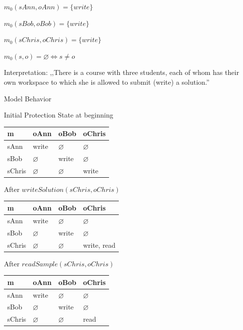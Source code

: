 \documentclass[a4paper]{article}
\begin{document}
\begin{multicols}{3}
\begin{itemize*}
\begin{itemize*}
\begin{itemize*}
                \item $m_0(sAnn,oAnn)=\{write\}$
                \item $m_0(sBob,oBob)=\{write\}$
                \item $m_0(sChris,oChris)=\{write\}$
                \item $m_0(s,o)=\varnothing \Leftrightarrow s\not= o$
            \end{itemize*}
            \item Interpretation: ,,There is a course with three students, each of whom has their own workspace to which she is allowed to submit (write) a solution.''
        \end{itemize*}
    \end{itemize*}

    Model Behavior
    \begin{itemize*}
        \item Initial Protection State at beginning
        \begin{center}\begin{tabular}{l|l|l|l}
                m      & oAnn          & oBob          & oChris        \\\hline
                sAnn   & {write}       & $\varnothing$ & $\varnothing$ \\
                sBob   & $\varnothing$ & {write}       & $\varnothing$ \\
                sChris & $\varnothing$ & $\varnothing$ & {write}
            \end{tabular}\end{center}
        \item After $writeSolution(sChris, oChris)$
        \begin{center}\begin{tabular}{l|l|l|l}
                m      & oAnn          & oBob          & oChris        \\\hline
                sAnn   & {write}       & $\varnothing$ & $\varnothing$ \\
                sBob   & $\varnothing$ & {write}       & $\varnothing$ \\
                sChris & $\varnothing$ & $\varnothing$ & {write, read}
            \end{tabular}\end{center}
        \item After $readSample(sChris, oChris)$
        \begin{center}\begin{tabular}{l|l|l|l}
                m      & oAnn          & oBob          & oChris        \\\hline
                sAnn   & {write}       & $\varnothing$ & $\varnothing$ \\
                sBob   & $\varnothing$ & {write}       & $\varnothing$ \\
                sChris & $\varnothing$ & $\varnothing$ & {read}
            \end{tabular}\end{center}
    \end{itemize*}


\end{multicols}
\end{document}
